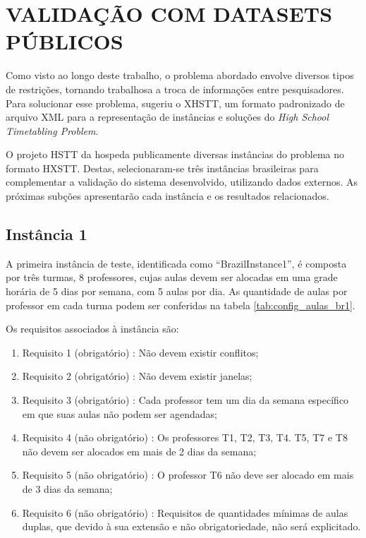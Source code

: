 \section{VALIDAÇÃO COM DATASETS PÚBLICOS}
\label{sec:validacao_datasets}

Como visto ao longo deste trabalho, o problema abordado envolve diversos tipos de restrições, tornando trabalhosa a troca de informações entre pesquisadores. Para solucionar esse problema,  sugeriu o XHSTT, um formato padronizado de arquivo XML para a representação de instâncias e soluções do \textit{High School Timetabling Problem}.

O projeto HSTT da  hospeda publicamente diversas instâncias do problema no formato HXSTT. Destas, selecionaram-se três instâncias brasileiras para complementar a validação do sistema desenvolvido, utilizando dados externos. As próximas subções apresentarão cada instância e os resultados relacionados.

\subsection{Instância 1}

A primeira instância de teste, identificada como ``BrazilInstance1'', é composta por três turmas, 8 professores, cujas aulas devem ser alocadas em uma grade horária de 5 dias por semana, com 5 aulas por dia. As quantidade de aulas por professor em cada turma podem ser conferidas na tabela \ref{tab:config_aulas_br1}.



Os requisitos associados à instância são:
\begin{enumerate}
	\item Requisito 1 (obrigatório) : Não devem existir conflitos;
	\item Requisito 2 (obrigatório) : Não devem existir janelas;
	\item Requisito 3 (obrigatório) : Cada professor tem um dia da semana específico em que suas aulas não podem ser agendadas;
	\item Requisito 4 (não obrigatório) : Os professores T1, T2, T3, T4. T5, T7 e T8 não devem ser alocados em mais de 2 dias da semana;
	\item Requisito 5 (não obrigatório) : O professor T6 não deve ser alocado em mais de 3 dias da semana;
	\item Requisito 6 (não obrigatório) : Requisitos de quantidades mínimas de aulas duplas, que devido à sua extensão e não obrigatoriedade, não será explicitado.
\end{enumerate}

